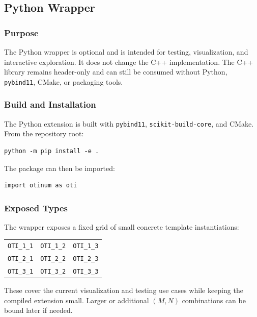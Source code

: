 \documentclass[11pt]{article}
\begin{document}
\subsection{Python Wrapper}

\subsubsection{Purpose}

The Python wrapper is optional and is intended for testing, visualization, and
interactive exploration. It does not change the C++ implementation. The C++
library remains header-only and can still be consumed without Python,
\texttt{pybind11}, CMake, or packaging tools.

\subsubsection{Build and Installation}

The Python extension is built with \texttt{pybind11},
\texttt{scikit-build-core}, and CMake. From the repository root:

\begin{lstlisting}[style=shellstyle]
python -m pip install -e .
\end{lstlisting}

The package can then be imported:

\begin{lstlisting}[style=pythonstyle]
import otinum as oti
\end{lstlisting}

\subsubsection{Exposed Types}

The wrapper exposes a fixed grid of small concrete template instantiations:

\begin{center}
\begin{tabular}{ccc}
\toprule
\texttt{OTI\_1\_1} & \texttt{OTI\_1\_2} & \texttt{OTI\_1\_3} \\
\texttt{OTI\_2\_1} & \texttt{OTI\_2\_2} & \texttt{OTI\_2\_3} \\
\texttt{OTI\_3\_1} & \texttt{OTI\_3\_2} & \texttt{OTI\_3\_3} \\
\bottomrule
\end{tabular}
\end{center}

These cover the current visualization and testing use cases while keeping the
compiled extension small. Larger or additional \((M,N)\) combinations can be
bound later if needed.
\end{document}
